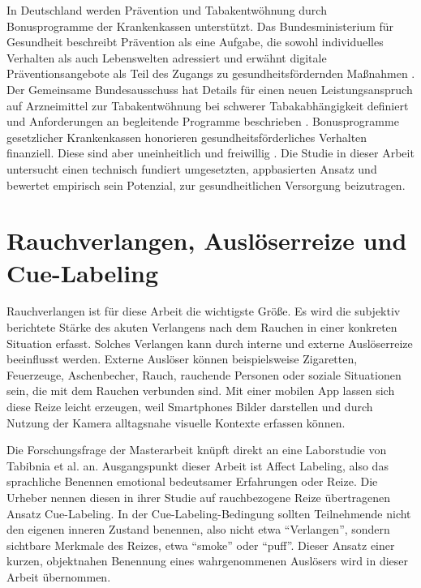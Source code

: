 In Deutschland werden Prävention und Tabakentwöhnung durch Bonusprogramme der Krankenkassen unterstützt. Das Bundesministerium für Gesundheit beschreibt Prävention als eine Aufgabe, die sowohl individuelles Verhalten als auch Lebenswelten adressiert und erwähnt digitale Präventionsangebote als Teil des Zugangs zu gesundheitsfördernden Maßnahmen \cite{bmg_gesund_bleiben_praevention_2025}. Der Gemeinsame Bundesausschuss hat Details für einen neuen Leistungsanspruch auf Arzneimittel zur Tabakentwöhnung bei schwerer Tabakabhängigkeit definiert und Anforderungen an begleitende Programme beschrieben \cite{gba_tabakentwoehnung_2025}. Bonusprogramme gesetzlicher Krankenkassen honorieren gesundheitsförderliches Verhalten finanziell. Diese sind aber uneinheitlich und freiwillig \cite{baecke_gkv_bonusprogramme_2026}. Die Studie in dieser Arbeit untersucht einen technisch fundiert umgesetzten, appbasierten Ansatz und bewertet empirisch sein Potenzial, zur gesundheitlichen Versorgung beizutragen.

\section{Rauchverlangen, Auslöserreize und Cue-Labeling}

Rauchverlangen ist für diese Arbeit die wichtigste Größe. Es wird die subjektiv berichtete Stärke des akuten Verlangens nach dem Rauchen in einer konkreten Situation erfasst. Solches Verlangen kann durch interne und externe Auslöserreize beeinflusst werden. Externe Auslöser können beispielsweise Zigaretten, Feuerzeuge, Aschenbecher, Rauch, rauchende Personen oder soziale Situationen sein, die mit dem Rauchen verbunden sind. Mit einer mobilen App lassen sich diese Reize leicht erzeugen, weil Smartphones Bilder darstellen und durch Nutzung der Kamera alltagsnahe visuelle Kontexte erfassen können.

Die Forschungsfrage der Masterarbeit knüpft direkt an eine Laborstudie von Tabibnia et al. an. Ausgangspunkt dieser Arbeit ist Affect Labeling, also das sprachliche Benennen emotional bedeutsamer Erfahrungen oder Reize. Die Urheber nennen diesen in ihrer Studie auf rauchbezogene Reize übertragenen Ansatz Cue-Labeling. In der Cue-Labeling-Bedingung sollten Teilnehmende nicht den eigenen inneren Zustand benennen, also nicht etwa \enquote{Verlangen}, sondern sichtbare Merkmale des Reizes, etwa \enquote{smoke} oder \enquote{puff}. Dieser Ansatz einer kurzen, objektnahen Benennung eines wahrgenommenen Auslösers wird in dieser Arbeit übernommen. \\
\cite{tabibnia_cuelabeling_2026}

